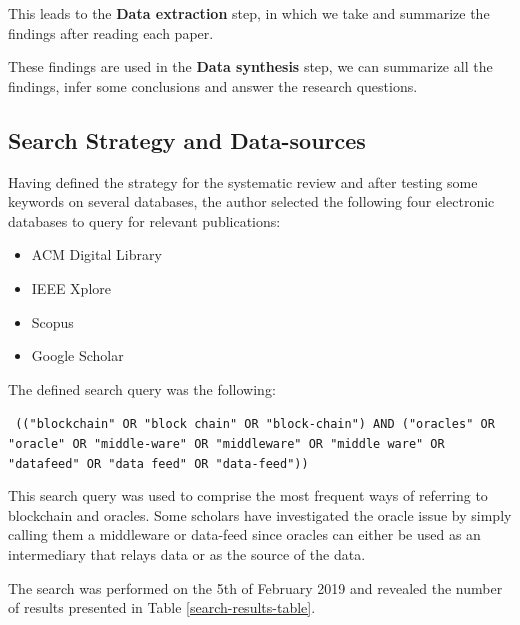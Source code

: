 \documentclass[final,3p,12pt,twocolumn]{elsarticle}
\begin{document}
This leads to the \textbf{Data extraction} step, in which we take and summarize the findings after reading each paper.

These findings are used in the \textbf{Data synthesis} step, we can summarize all the findings, infer some conclusions and answer the research questions.

\subsection{Search Strategy and Data-sources}
Having defined the strategy for the systematic review and after testing some keywords on several databases, the author selected the following four electronic databases to query for relevant publications:

\begin{itemize}
  \item ACM Digital Library
  \item IEEE Xplore
  \item Scopus
  \item Google Scholar
\end{itemize}

The defined search query was the following:

\texttt{
  (("blockchain" OR "block chain" OR "block-chain")
  AND
  ("oracles" OR "oracle" OR "middle-ware" OR "middleware" OR "middle ware" OR "datafeed" OR "data feed" OR "data-feed"))
}

This search query was used to comprise the most frequent ways of referring to blockchain and oracles. Some scholars have investigated the oracle issue by simply calling them a middleware or data-feed since oracles can either be used as an intermediary that relays data or as the source of the data.

The search was performed on the 5th of February 2019 and revealed the number of results presented in Table \ref{search-results-table}.

\begin{table}[h]
  \begin{minipage}[c]{\textwidth}
    \centering
    \caption{Number of results and applied filters per database}
    \label{search-results-table}
  \end{minipage}
\end{table}
\end{document}
